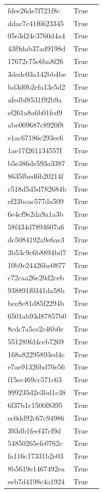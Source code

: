 \begin{tabular}{lrl}
fdee26de7f721f8c & True &  \\
ddac7c41f6623345 & True &  \\
05e3d24c3760d4a4 & True &  \\
43f9dab37ad9198d & True &  \\
17672c75c6ba8f26 & True &  \\
3dedc03a142bb4be & True &  \\
bd3d0b2efa13e5d2 & True &  \\
afedbf8531f92b9a & True &  \\
ef261a8a6b01fcd9 & True &  \\
abe009687c8920f8 & True &  \\
e1ac67186c293ec6 & True &  \\
1ae17f261134557f & True &  \\
b5e386de593a3387 & True &  \\
8635fbed6b20214f & True &  \\
c518d5d5d782684b & True &  \\
ef23bcac577da509 & True &  \\
6e4cf9e2da9a1a3b & True &  \\
58f434d7894607a6 & True &  \\
dc5084192a9e6ae3 & True &  \\
3b53c9c6b8894bd7 & True &  \\
10b9c24426be0877 & True &  \\
c72caa26e20d2ceb & True &  \\
938891f0341da58b & True &  \\
bcc8c81d85f2294b & True &  \\
6501ab93d87857b0 & True &  \\
8cdc7a5ce2c46b0c & True &  \\
551289fd4ceb7269 & True &  \\
168a82295893ed4c & True &  \\
e7ae91326bd70e56 & True &  \\
f15ec469cc571c63 & True &  \\
999235d2e3bd1c38 & True &  \\
6f37b1c1500f8395 & True &  \\
ec0dd92c67c94986 & True &  \\
393db1feef47cf9d & True &  \\
54850265efe0762c & True &  \\
fa116c17331b2e03 & True &  \\
8b5619e1467492ea & True &  \\
eeb7d4198c4a1924 & True &  \\

\end{tabular}
